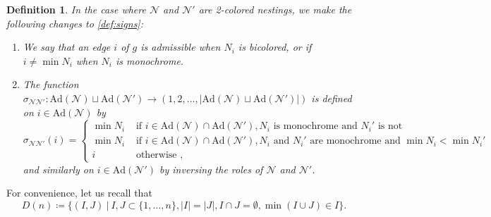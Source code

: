 \documentclass[twoside, 12pt]{amsart}
\newtheorem{definition}{Definition}[section]
\theoremstyle{remark}
\begin{document}
\begin{definition} In the case where $\mathcal{N}$ and $\mathcal{N}'$ are 2-colored nestings, we make the following changes to \cref{def:signs}:
\begin{enumerate}[leftmargin=*]
\item[(2)] We say that an edge $i$ of $g$ is \emph{admissible} when $N_i$ is bicolored, or if $i \neq \min N_i$ when $N_i$ is monochrome. 
\item[(4)] The function $\sigma_{\mathcal{N}\mathcal{N}'}: \mathrm{Ad}(\mathcal{N})\sqcup \mathrm{Ad}(\mathcal{N}') \to (1,2,\ldots,|\mathrm{Ad}(\mathcal{N})\sqcup \mathrm{Ad}(\mathcal{N}')|)$ is defined on $i \in \mathrm{Ad}(\mathcal{N})$ by 
\begin{equation*}
  \sigma_{\mathcal{N}\mathcal{N}'}(i)= 
  \begin{cases}
    \min N_i & \text{ if } i \in \mathrm{Ad}(\mathcal{N})\cap \mathrm{Ad}(\mathcal{N}') , N_i \text{ is monochrome and } N_i' \text{ is not} \\
    \min N_i & \text{ if } i \in \mathrm{Ad}(\mathcal{N})\cap \mathrm{Ad}(\mathcal{N}'), N_i \text{ and } N_i' \text{ are monochrome and } \min N_i < \min N_i' \\ 
    i & \text{ otherwise ,} 
  \end{cases}
\end{equation*}
and similarly on $i \in \mathrm{Ad}(\mathcal{N}')$ by inversing the roles of $\mathcal{N}$ and $\mathcal{N}'$.
\end{enumerate}
\end{definition}

For convenience, let us recall that \[ D(n)\coloneqq \{(I,J) \ | \ I,J\subset\{1,\ldots,n\}, |I|=|J|, I\cap J=\emptyset, \min(I\cup J)\in I \}. \]
\end{document}
